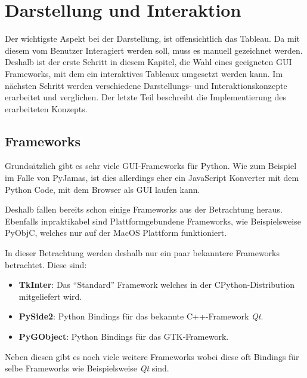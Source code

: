 
\chapter{Darstellung und Interaktion}
Der wichtigste Aspekt bei der Darstellung, ist offensichtlich das Tableau. Da mit diesem vom Benutzer Interagiert werden soll, muss es manuell gezeichnet werden. Deshalb ist der erste Schritt in diesem Kapitel, die Wahl eines geeigneten \ac{GUI} Frameworks, mit dem ein interaktives Tableaux umgesetzt werden kann. Im nächsten Schritt werden verschiedene Darstellungs- und Interaktionskonzepte erarbeitet und verglichen. Der letzte Teil beschreibt die Implementierung des erarbeiteten Konzepts.

\section{Frameworks}
Grundsätzlich gibt es sehr viele \ac{GUI}-Frameworks für Python. Wie zum Beispiel im Falle von PyJamas, ist dies allerdings eher ein JavaScript Konverter mit dem Python Code, mit dem Browser als \ac{GUI} laufen kann.

Deshalb fallen bereits schon einige Frameworks aus der Betrachtung heraus. Ebenfalls inpraktikabel sind Plattformgebundene Frameworks, wie Beispielsweise PyObjC, welches nur auf der MacOS Plattform funktioniert.

In dieser Betrachtung werden deshalb nur ein paar bekanntere Frameworks betrachtet. Diese sind:
\begin{itemize}
\item \textbf{TkInter}: Das ``Standard'' Framework welches in der CPython-Distribution mitgeliefert wird.

\item \textbf{PySide2}: Python Bindings für das bekannte C++-Framework \textit{Qt}.

\item \textbf{PyGObject}: Python Bindings für das GTK-Framework.
\end{itemize}
Neben diesen gibt es noch viele weitere Frameworks wobei diese oft Bindings für selbe Frameworks wie Beispielsweise \textit{Qt} sind.

